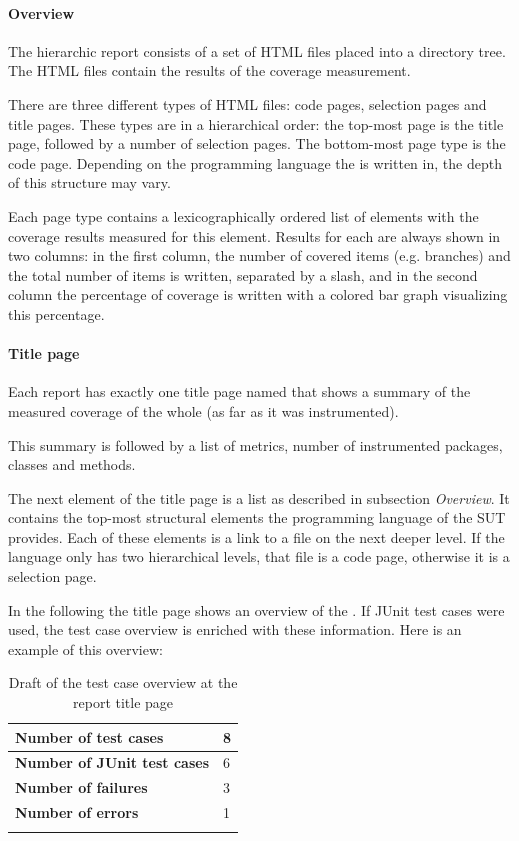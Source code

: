 \paragraph{Overview}
The hierarchic  report consists of a set of HTML files placed into a directory tree. The HTML files contain the results of the coverage measurement.
\par
There are three different types of HTML files: code pages, selection pages and title pages. These types are in a hierarchical order: the top-most page is the title page, followed by a number of selection pages. The bottom-most page type is the code page. Depending on the programming language the  is written in, the depth of this structure may vary.
\par
Each page type contains a lexicographically ordered list of elements with the coverage results measured for this element. Results for each  are always shown in two columns: in the first column, the number of covered items (e.g. branches) and the total number of items is written, separated by a slash, and in the second column the percentage of coverage is written with a colored bar graph visualizing this percentage.

\paragraph{Title page} \label{fr:Report: Title page} 
Each report has exactly one title page named  that shows a summary of the measured coverage of the whole  (as far as it was instrumented).
\par
This summary is followed by a list of metrics, number of instrumented packages, classes and methods.
\par
The next element of the title page is a list as described in subsection \textit{Overview}. It contains the top-most structural elements the programming language of the SUT provides. Each of these elements is a link to a file on the next deeper level. If the language only has two hierarchical levels, that file is a code page, otherwise it is a selection page.
\par
In the following the title page shows an overview of the . If JUnit test cases were used, the test case overview is enriched with these information. Here is an example of this overview:

\begin{longtable}{l|l}
   \textbf{Number of test cases} &
     8 \\\hline
   \textbf{Number of JUnit test cases} &
     6 \\\hline
   \textbf{Number of failures} &
     3 \\\hline
   \textbf{Number of errors} &
     1 \\

  \caption{Draft of the test case overview at the report title page}
  \label{fr_tb:Report: test case overview}
\end{longtable}

